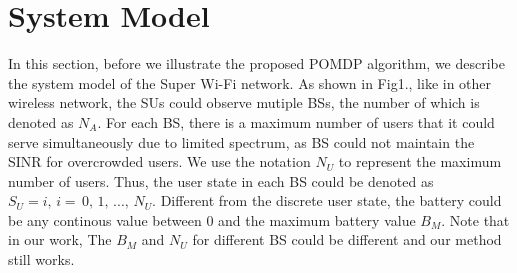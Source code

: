 \documentclass[conference]{IEEEtran}
\begin{document}
\section{System Model}
In this section, before we illustrate the proposed POMDP algorithm,
we describe the system model of the Super Wi-Fi network.
As shown in Fig1., like in other wireless network,
the SUs could observe mutiple BSs, the number of which is denoted as \(N_A\).
For each BS, there is a maximum number of users that it could serve simultaneously due to limited spectrum,
as BS could not maintain the SINR for overcrowded users.
We use the notation \(N_U\) to represent the maximum number of users.
Thus, the user state in each BS could be denoted as \(S_U = i,\, i = \,0,\,1,\,...,\,N_U\).
Different from the discrete user state, the battery could be any continous value between \(0\)
and the maximum battery value \(B_M\). 
Note that in our work, The \(B_M\) and \(N_U\) for different BS could be different and our method still works.\\
\end{document}
